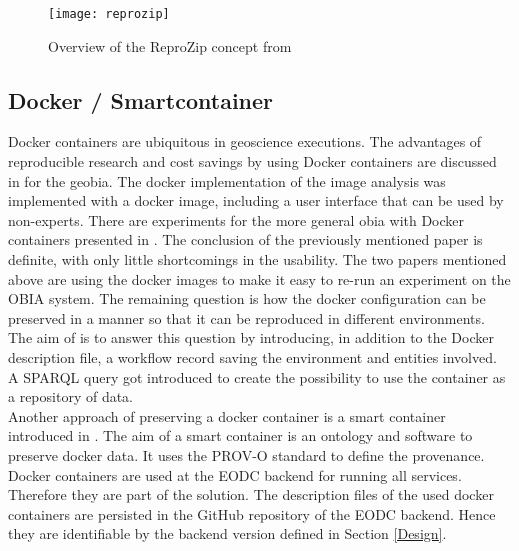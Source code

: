 \documentclass[draft,final]{vutinfth} %
\begin{document}
\begin{figure}[h]
	\centering
	\texttt{[image: reprozip]}
	\caption{Overview of the ReproZip concept from \cite{29c5846926a4497d95f276604cb0368c} }
	\label{fig:reprozip} %
\end{figure}

\subsection{Docker / Smartcontainer}\label{Smartcontainer}
Docker containers are ubiquitous in geoscience executions. The advantages of reproducible research and cost savings by using Docker containers are discussed in \cite{rs9030290} for the \gls{geobia}. The docker implementation of the image analysis was implemented with a docker image, including a user interface that can be used by non-experts. There are experiments for the more general \gls{obia} with Docker containers presented in \cite{proceedings456}. The conclusion of the previously mentioned paper is definite, with only little shortcomings in the usability. The two papers mentioned above are using the docker images to make it easy to re-run an experiment on the OBIA system. The remaining question is how the docker configuration can be preserved in a manner so that it can be reproduced in different environments. The aim of \cite{emsley2017a} is to answer this question by introducing, in addition to the Docker description file, a workflow record saving the environment and entities involved. A SPARQL query got introduced to create the possibility to use the container as a repository of data.\\ 
Another approach of preserving a docker container is a smart container introduced in \cite{Huo2015SmartCA}. The aim of a smart container is an ontology and software to preserve docker data. It uses the PROV-O standard to define the provenance. 
Docker containers are used at the EODC backend for running all services. Therefore they are part of the solution. The description files of the used docker containers are persisted in the GitHub repository of the EODC backend. Hence they are identifiable by the backend version defined in Section \ref{Design}.   
\end{document}
